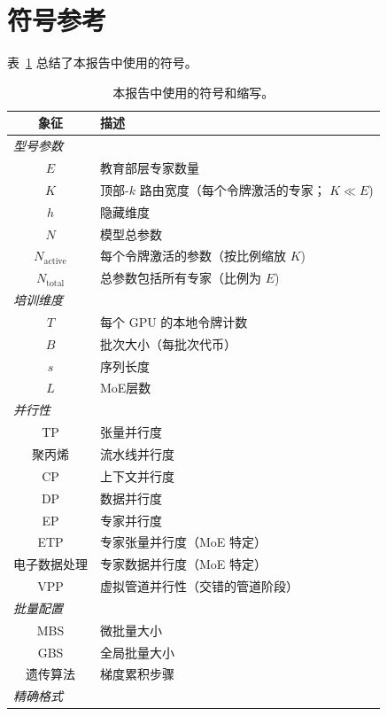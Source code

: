 


\newpage
\appendix

\section{符号参考}\label{sec:notation}

表~\ref{tab:notation} 总结了本报告中使用的符号。

\begin{table}[ht]
\centering
\caption{本报告中使用的符号和缩写。}
\label{tab:notation}
\begin{tabular}{cl}
\toprule
\textbf{象征} & \textbf{描述} \\
\midrule
\multicolumn{2}{l}{\emph{型号参数}} \\
$E$ & 教育部层专家数量 \\
$K$ & 顶部-$k$ 路由宽度（每个令牌激活的专家； $K \ll E$) \\
$h$ & 隐藏维度 \\
$N$ & 模型总参数 \\
$N_{\text{active}}$ & 每个令牌激活的参数（按比例缩放 $K$) \\
$N_{\text{total}}$ & 总参数包括所有专家（比例为 $E$) \\
\midrule
\multicolumn{2}{l}{\emph{培训维度}} \\
$T$ & 每个 GPU 的本地令牌计数 \\
$B$ & 批次大小（每批次代币） \\
$s$ & 序列长度 \\
$L$ & MoE层数 \\
\midrule
\multicolumn{2}{l}{\emph{并行性}} \\
TP & 张量并行度 \\
聚丙烯 & 流水线并行度 \\
CP & 上下文并行度 \\
DP & 数据并行度 \\
EP & 专家并行度 \\
ETP & 专家张量并行度（MoE 特定） \\
电子数据处理 & 专家数据并行度（MoE 特定） \\
VPP & 虚拟管道并行性（交错的管道阶段） \\
\midrule
\multicolumn{2}{l}{\emph{批量配置}} \\
MBS & 微批量大小 \\
GBS & 全局批量大小 \\
遗传算法 & 梯度累积步骤 \\
\midrule
\multicolumn{2}{l}{\emph{精确格式}} \\

\end{tabular}
\end{table}
